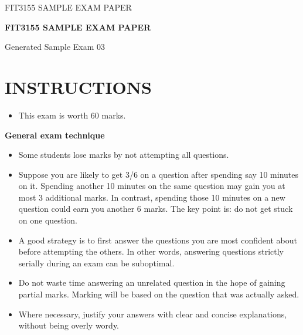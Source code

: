 \documentclass[12pt,letterpaper]{article}
\begin{document}
\begin{titlepage}
  \thispagestyle{empty}
  \vspace*{0.18\textheight}
  {\Large FIT3155 \hfill SAMPLE EXAM PAPER\par}
  \vspace{2.2cm}
  \begin{center}
    {\LARGE\bfseries FIT3155 SAMPLE EXAM PAPER\par}
    \vspace{0.8cm}
    {\large Generated Sample Exam 03\par}
  \end{center}
\end{titlepage}

\setcounter{page}{2}

\section*{INSTRUCTIONS}

\begin{itemize}
  \item This exam is worth 60 marks.
\end{itemize}

\begin{center}
  \textbf{General exam technique}
\end{center}

\begin{itemize}
  \item Some students lose marks by not attempting all questions.

  \item Suppose you are likely to get 3/6 on a question after spending say 10 minutes on it.
  Spending another 10 minutes on the same question may gain you at most 3 additional
  marks. In contrast, spending those 10 minutes on a new question could earn you another
  6 marks. The key point is: do not get stuck on one question.

  \item A good strategy is to first answer the questions you are most confident about before
  attempting the others. In other words, answering questions strictly serially during an
  exam can be suboptimal.

  \item Do not waste time answering an unrelated question in the hope of gaining partial marks.
  Marking will be based on the question that was actually asked.

  \item Where necessary, justify your answers with clear and concise explanations, without being
  overly wordy.
\end{itemize}
\end{document}
